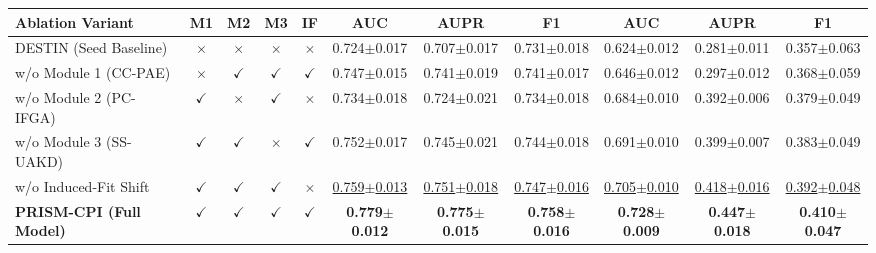 \begin{table}[H]
{{\begin{tabular}{l cccc ccc ccc}
\cmidrule(lr){2-5} \cmidrule(lr){6-8} \cmidrule(lr){9-11}
\textbf{Ablation Variant} & \textbf{M1} & \textbf{M2} & \textbf{M3} & \textbf{IF} & \textbf{AUC} & \textbf{AUPR} & \textbf{F1} & \textbf{AUC} & \textbf{AUPR} & \textbf{F1} \\
\midrule
DESTIN (Seed Baseline) & $\times$ & $\times$ & $\times$ & $\times$ & 0.724${\pm}$0.017 & 0.707${\pm}$0.017 & 0.731${\pm}$0.018 & 0.624${\pm}$0.012 & 0.281${\pm}$0.011 & 0.357${\pm}$0.063 \\
w/o Module 1 (CC-PAE) & $\times$ & $\checkmark$ & $\checkmark$ & $\checkmark$ & 0.747${\pm}$0.015 & 0.741${\pm}$0.019 & 0.741${\pm}$0.017 & 0.646${\pm}$0.012 & 0.297${\pm}$0.012 & 0.368${\pm}$0.059 \\
w/o Module 2 (PC-IFGA) & $\checkmark$ & $\times$ & $\checkmark$ & $\times$ & 0.734${\pm}$0.018 & 0.724${\pm}$0.021 & 0.734${\pm}$0.018 & 0.684${\pm}$0.010 & 0.392${\pm}$0.006 & 0.379${\pm}$0.049 \\
w/o Module 3 (SS-UAKD) & $\checkmark$ & $\checkmark$ & $\times$ & $\checkmark$ & 0.752${\pm}$0.017 & 0.745${\pm}$0.021 & 0.744${\pm}$0.018 & 0.691${\pm}$0.010 & 0.399${\pm}$0.007 & 0.383${\pm}$0.049 \\
w/o Induced-Fit Shift & $\checkmark$ & $\checkmark$ & $\checkmark$ & $\times$ & \underline{0.759${\pm}$0.013} & \underline{0.751${\pm}$0.018} & \underline{0.747${\pm}$0.016} & \underline{0.705${\pm}$0.010} & \underline{0.418${\pm}$0.016} & \underline{0.392${\pm}$0.048} \\
\midrule
\textbf{PRISM-CPI (Full Model)} & $\checkmark$ & $\checkmark$ & $\checkmark$ & $\checkmark$ & \textbf{0.779${\pm}$0.012} & \textbf{0.775${\pm}$0.015} & \textbf{0.758${\pm}$0.016} & \textbf{0.728${\pm}$0.009} & \textbf{0.447${\pm}$0.018} & \textbf{0.410${\pm}$0.047} \\
\bottomrule
\end{tabular}%
}}
\end{table}

